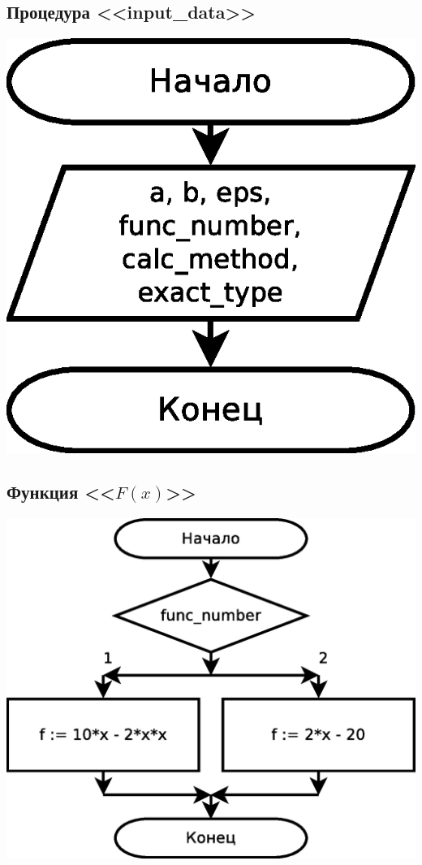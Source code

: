 \documentclass[a4paper]{article}
\begin{document}
\subsection{Процедура <<input\_data>>}
\includegraphics[scale=0.5]{schemes/input_data}

\subsection{Функция <<$F(x)$>>}
\includegraphics[scale=0.5]{schemes/f}
\end{document}
